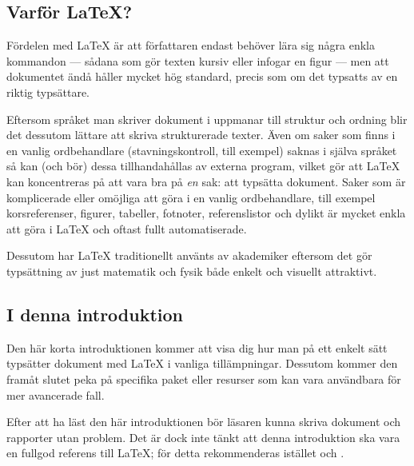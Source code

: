 \documentclass[../../a4.tex]{subfiles}
\begin{document}
{}
\subsection*{Varför \LaTeX?}
Fördelen med \LaTeX{} är att författaren endast behöver lära sig några
enkla kommandon — sådana som gör texten kursiv eller infogar en figur
— men att dokumentet ändå håller mycket hög standard, precis som om
det typsatts av en riktig typsättare.

Eftersom språket man skriver dokument i uppmanar till struktur och ordning
blir det dessutom lättare att skriva strukturerade texter. Även om saker
som finns i en vanlig ordbehandlare (stavningskontroll, till exempel) saknas i
själva språket så kan (och bör) dessa tillhandahållas av externa program,
vilket gör att \LaTeX{} kan koncentreras på att vara bra på \emph{en} sak:
att typsätta dokument. Saker som är komplicerade eller omöjliga att göra
i en vanlig ordbehandlare, till exempel korsreferenser, figurer, tabeller,
fotnoter, referenslistor och dylikt är mycket enkla att göra i \LaTeX{}
och oftast fullt automatiserade.

Dessutom har \LaTeX{} traditionellt använts av akademiker eftersom det gör 
typsättning av just matematik och fysik både enkelt och visuellt attraktivt. 

\vspace{-1em}
\subsection*{I denna introduktion}
Den här korta introduktionen kommer att visa dig hur man på ett enkelt
sätt typsätter dokument med \LaTeX{} i vanliga tillämpningar.
Dessutom kommer den framåt slutet peka på specifika paket eller
resurser som kan vara användbara för mer avancerade fall.

Efter att ha läst den här introduktionen bör läsaren kunna skriva
dokument och rapporter utan problem. Det är dock inte tänkt att denna
introduktion ska vara en fullgod referens till \LaTeX; för detta
rekommenderas istället  och
.
\end{document}
